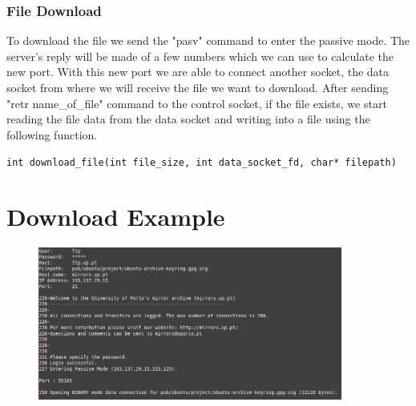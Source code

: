 \documentclass[11pt]{report}
\begin{document}
\subsubsection{File Download}

To download the file we send the "pasv" command to enter the passive mode. The server's reply will be made of a few numbers which we can use to calculate the new port. With this new port we are able to connect another socket, the data socket from where we will receive the file we want to download. After sending "retr name\_of\_file" command to the control socket, if the file exists, we start reading the file data from the data socket and writing into a file using the following function. 

\texttt{int download_file(int file_size, int data_socket_fd, char* filepath) }

\newpage

\section{Download Example}

\begin{figure}[h!]
    \includegraphics[width=10cm]{images/download_example.png}
\end{figure}
\end{document}
